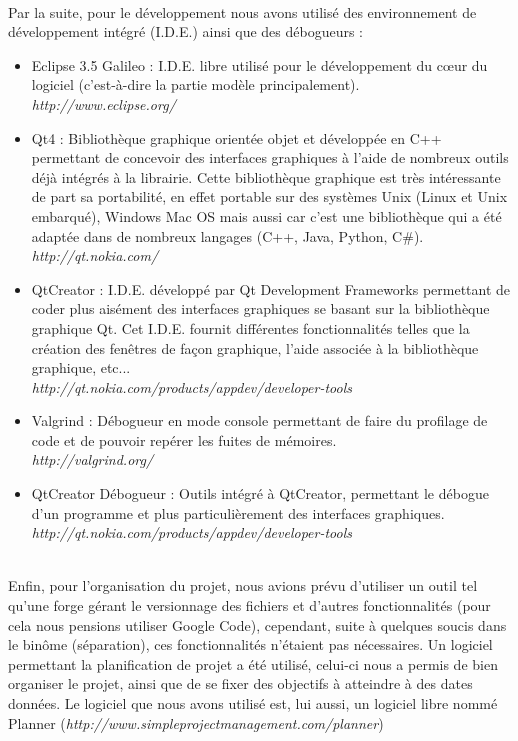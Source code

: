 \documentclass[11pt,a4paper]{article}
\begin{document}
			~\\Par la suite, pour le développement nous avons utilisé des environnement de développement intégré (I.D.E.) ainsi que des débogueurs : 
			\begin{itemize}
				 \item Eclipse 3.5 Galileo : I.D.E. libre utilisé pour le développement du c\oe ur du logiciel (c'est-à-dire la partie modèle principalement). \\
				 \textit{http://www.eclipse.org/}
				 \item Qt4 : Bibliothèque graphique orientée objet et développée en C++ permettant de concevoir des interfaces graphiques à l'aide de nombreux outils déjà intégrés à la librairie. Cette bibliothèque graphique est très intéressante de part sa portabilité, en effet portable sur des systèmes Unix (Linux et Unix embarqué), Windows Mac OS mais aussi car c'est une bibliothèque qui a été adaptée dans de nombreux langages (C++, Java, Python, C\#). \\
				 \textit{http://qt.nokia.com/}
				 \item QtCreator : I.D.E. développé par Qt Development Frameworks permettant de coder plus aisément des interfaces graphiques se basant sur la bibliothèque graphique Qt. Cet I.D.E. fournit différentes fonctionnalités telles que la création des fenêtres de façon graphique, l'aide associée à la bibliothèque graphique, etc... \\
				 \textit{http://qt.nokia.com/products/appdev/developer-tools}
				 \item Valgrind : Débogueur en mode console permettant de faire du profilage de code et de pouvoir repérer les fuites de mémoires. \\
				 \textit{http://valgrind.org/}
				 \item QtCreator Débogueur : Outils intégré à QtCreator, permettant le débogue d'un programme et plus particulièrement des interfaces graphiques. \\
				 \textit{http://qt.nokia.com/products/appdev/developer-tools}
			\end{itemize}
		
			~\\Enfin, pour l'organisation du projet, nous avions prévu d'utiliser un outil tel qu'une forge gérant le versionnage des fichiers et d'autres fonctionnalités (pour cela nous pensions utiliser Google Code), cependant, suite à quelques soucis dans le binôme (séparation), ces fonctionnalités n'étaient pas nécessaires. 
			Un logiciel permettant la planification de projet a été utilisé, celui-ci nous a permis de bien organiser le projet, ainsi que de se fixer des objectifs à atteindre à des dates données. Le logiciel que nous avons utilisé est, lui aussi, un logiciel libre nommé Planner (\textit{http://www.simpleprojectmanagement.com/planner})
\end{document}
